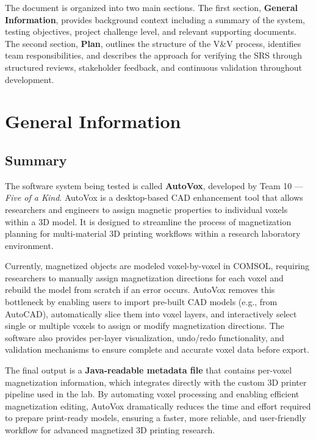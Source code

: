 \documentclass[12pt, titlepage]{article}
\begin{document}
The document is organized into two main sections. The first section, \textbf{General Information}, provides background context including a summary of the system, testing objectives, project challenge level, and relevant supporting documents. The second section, \textbf{Plan}, outlines the structure of the V\&V process, identifies team responsibilities, and describes the approach for verifying the SRS through structured reviews, stakeholder feedback, and continuous validation throughout development.

\section{General Information}

\subsection{Summary}

The software system being tested is called \textbf{AutoVox}, developed by Team 10 --- \textit{Five of a Kind}. AutoVox is a desktop-based CAD enhancement tool that allows researchers and engineers to assign magnetic properties to individual voxels within a 3D model. It is designed to streamline the process of magnetization planning for multi-material 3D printing workflows within a research laboratory environment.

Currently, magnetized objects are modeled voxel-by-voxel in COMSOL, requiring researchers to manually assign magnetization directions for each voxel and rebuild the model from scratch if an error occurs. AutoVox removes this bottleneck by enabling users to import pre-built CAD models (e.g., from AutoCAD), automatically slice them into voxel layers, and interactively select single or multiple voxels to assign or modify magnetization directions. The software also provides per-layer visualization, undo/redo functionality, and validation mechanisms to ensure complete and accurate voxel data before export.

The final output is a \textbf{Java-readable metadata file} that contains per-voxel magnetization information, which integrates directly with the custom 3D printer pipeline used in the lab. By automating voxel processing and enabling efficient magnetization editing, AutoVox dramatically reduces the time and effort required to prepare print-ready models, ensuring a faster, more reliable, and user-friendly workflow for advanced magnetized 3D printing research.
\end{document}
